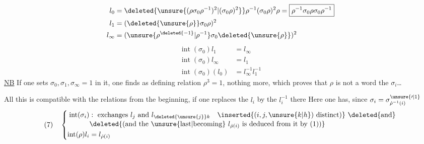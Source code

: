 {\[
\begin{aligned}
l_0&=\deleted{\unsure{(\rho\sigma_0\rho^{-1})^2|(\sigma_0\rho)^2}}\rho^{-1}(\sigma_0\rho)^2\rho
=\boxed{\rho^{-1}\sigma_0\rho\sigma_0\rho^{-1}}\\
l_1&=(\deleted{\unsure{\rho}}\sigma_0\rho)^2\\
l_\infty&=(\unsure{\rho^{\deleted{-1}}|\rho^{-1}}\sigma_0\deleted{\unsure{\rho}})^2
\end{aligned}
\]
\[
\begin{aligned}
\operatorname{int}(\sigma_0)l_1&=l_\infty\\
\operatorname{int}(\sigma_0)l_\infty&=l_1\\
\operatorname{int}(\sigma_0)(l_0)&=l_\infty^{-1}l_1^{-1}
\end{aligned}
\]}
\uline{NB} If one sets  $\sigma_0,\sigma_1,\sigma_\infty=1$ in it, one finds as defining relation $\rho^3=1$,  nothing more, which proves that $\rho$ is not a word  the $\sigma_i$\ldots

All this is compatible with the relations from the beginning, 
  if one replaces the $l_i$ by the $l_i^{-1}$ there
Here one has, since $\sigma_i=\sigma^{\unsure{\prime|1}}_{\dot\rho^{-1}(i)}$
\[
(7)\quad\left\{\begin{aligned}
\operatorname{int}(\sigma_i)&:\text{ exchanges }l_j\text{ and }l_{\deleted{\unsure{j}}k}
\quad\inserted{(i,j,\unsure{k|h})\text{ distinct})}\ \deleted{\text{and}}\\[-2pt]
&\deleted{\text{(and the }\unsure{\text{last}|\text{becoming}}\ l_{\dot\rho(i)}\ \text{is deduced from it by (1))}}\\
\operatorname{int}(\rho)l_i&=l_{\dot\rho(i)}
\end{aligned}\right.
\]

